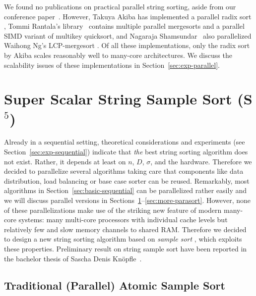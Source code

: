 \documentclass[a4paper]{myjournal}
\begin{document}
We found no publications on practical parallel string sorting, aside from our
conference paper~\cite{bingmann2013parallel}. However, Ta\-kuya Akiba has
implemented a parallel radix sort \cite{akiba2011radixsort}, Tommi Rantala's
library~\cite{rantala2007web} contains multiple parallel mergesorts and a
parallel SIMD variant of multikey quicksort, and Nagaraja
Shamsundar~\cite{shamsundar2009lcpmergesort} also parallelized Waihong Ng's
LCP-mergesort \cite{ng2008merging}. Of all these implementations, only the radix
sort by Akiba scales reasonably well to many-core architectures.  We discuss the
scalability issues of these implementations in Section~\ref{sec:exp-parallel}.

\section{Super Scalar String Sample Sort (\texorpdfstring{S$^5$}{S5})}\label{sec:s5}

Already in a sequential setting, theoretical considerations and experiments (see
Section~\ref{sec:exp-sequential}) indicate that \emph{the} best string sorting
algorithm does not exist.  Rather, it depends at least on $n$, $D$, $\sigma$,
and the hardware.  Therefore we decided to parallelize several algorithms taking
care that components like data distribution, load balancing or base case sorter
can be reused.  Remarkably, most algorithms in
Section~\ref{sec:basic-sequential} can be parallelized rather easily and we will
discuss parallel versions in
Sections~\ref{sec:s5}--\ref{sec:more-parasort}. However, none of these
parallelizations make use of the striking new feature of modern many-core
systems: many multi-core processors with individual cache levels but relatively
few and slow memory channels to shared RAM. Therefore we decided to design a new
string sorting algorithm based on \emph{sample sort}
\cite{frazer1970samplesort}, which exploits these properties.  Preliminary
result on string sample sort have been reported in the bachelor thesis of Sascha
Denis Knöpfle~\cite{knoepfle2012string}.

\subsection{Traditional (Parallel) Atomic Sample Sort}\label{sec:ss-atomic}
\end{document}
